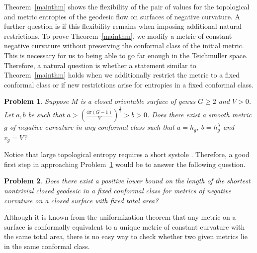 \documentclass[12pt]{article}
\numberwithin{equation}{section}
\newtheorem{problem}{Problem}
\theoremstyle{definition}
\begin{document}
Theorem~\ref{mainthm} shows the flexibility of the pair of values for the topological and metric entropies of the geodesic flow on surfaces of negative curvature. A further question is if this flexibility remains when imposing additional natural restrictions. To prove Theorem~\ref{mainthm}, we modify a metric of constant negative curvature without preserving the conformal class of the initial metric. This is necessary for us to being able to go far enough in the Teichm\"uller space. Therefore, a natural question is whether a statement similar to Theorem~\ref{mainthm} holds when we additionally restrict the metric to a fixed conformal class or if new restrictions arise for entropies in a fixed conformal class. 

\begin{problem}\label{pr1}
Suppose $M$ is a closed  orientable surface of genus $G\geqslant 2$ and $V>0$. Let  $a, b$  be such that $a>\left(\frac{4\pi(G-1)}{V}\right)^{\frac{1}{2}}>b>0$. Does there exist a smooth metric $g$ of negative curvature in any conformal class such that $a = h_g$, $b = h_g^\lambda$ and $v_g = V$?
\end{problem} 


Notice that large topological entropy requires a short systole \cite[Theorem 5.1]{BE}. Therefore, a good first step in approaching Problem~\ref{pr1} would be to answer the following question.

\begin{problem}\label{pr2}
Does there exist a positive lower bound on the length of the shortest nontrivial closed geodesic in a fixed conformal class for metrics of negative curvature on a closed surface with fixed total area?
\end{problem}

Although it is known from the uniformization theorem that any metric on a surface is conformally equivalent to a unique metric of constant curvature with the same total area, there is no easy way to check whether two given metrics lie in the same conformal class. 
\end{document}

